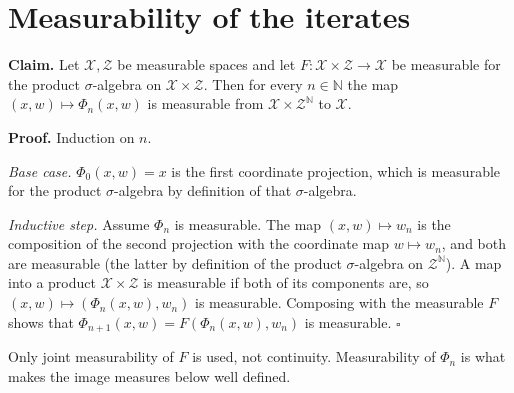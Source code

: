\documentclass[11pt,a4paper]{article}
\begin{document}
\section{\texorpdfstring{Measurability of the iterates}{Measurability of the iterates}}


\textbf{Claim.} Let \(\mathcal X,\mathcal Z\) be measurable spaces and let \(F:\mathcal X\times\mathcal Z\to\mathcal X\) be measurable for the product \(\sigma\)-algebra on \(\mathcal X\times\mathcal Z\). Then for every \(n\in\mathbb N\) the map \((x,w)\mapsto\Phi_n(x,w)\) is measurable from \(\mathcal X\times\mathcal Z^{\mathbb N}\) to \(\mathcal X\).




\textbf{Proof.} Induction on \(n\).




\emph{Base case.} \(\Phi_0(x,w)=x\) is the first coordinate projection, which is measurable for the product \(\sigma\)-algebra by definition of that \(\sigma\)-algebra.




\emph{Inductive step.} Assume \(\Phi_n\) is measurable. The map \((x,w)\mapsto w_n\) is the composition of the second projection with the coordinate map \(w\mapsto w_n\), and both are measurable (the latter by definition of the product \(\sigma\)-algebra on \(\mathcal Z^{\mathbb N}\)). A map into a product \(\mathcal X\times\mathcal Z\) is measurable if both of its components are, so \((x,w)\mapsto(\Phi_n(x,w),w_n)\) is measurable. Composing with the measurable \(F\) shows that \(\Phi_{n+1}(x,w)=F(\Phi_n(x,w),w_n)\) is measurable. \(\square\)




Only joint measurability of \(F\) is used, not continuity. Measurability of \(\Phi_n\) is what makes the image measures below well defined.
\end{document}
